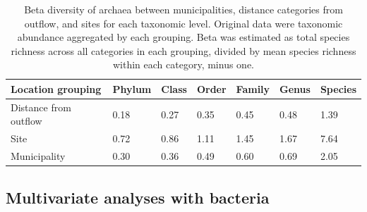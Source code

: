 \documentclass[letterpaper,12pt]{article}\usepackage[]{graphicx}\usepackage[]{color}
\begin{document}
\begin{table}[!tbp]
\caption{Beta diversity of archaea between municipalities, distance categories from outflow, and sites for each taxonomic level.  Original data were taxonomic abundance aggregated by each grouping.  Beta was estimated as total species richness across all categories in each grouping, divided by mean species richness within each category, minus one.\label{tab:beta_arch}} 
\begin{center}
\begin{tabular}{lllllll}
\hline\hline
\multicolumn{1}{l}{Location grouping}&\multicolumn{1}{c}{Phylum}&\multicolumn{1}{c}{Class}&\multicolumn{1}{c}{Order}&\multicolumn{1}{c}{Family}&\multicolumn{1}{c}{Genus}&\multicolumn{1}{c}{Species}\tabularnewline
\hline
Distance from outflow&0.18&0.27&0.35&0.45&0.48&1.39\tabularnewline
Site&0.72&0.86&1.11&1.45&1.67&7.64\tabularnewline
Municipality&0.30&0.36&0.49&0.60&0.69&2.05\tabularnewline
\hline
\end{tabular}\end{center}
\end{table}


\subsection{Multivariate analyses with bacteria}
\end{document}
